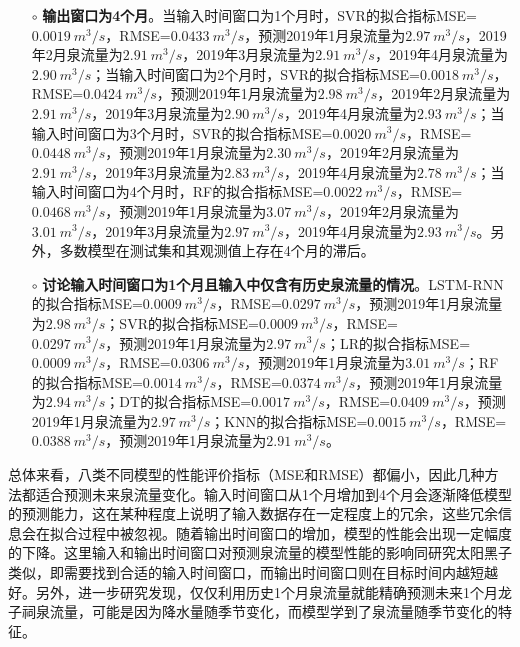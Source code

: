 \begin{enumerate}
\begin{itemize}
    \item[$\circ$] \textbf{输出窗口为4个月}。当输入时间窗口为1个月时，SVR的拟合指标MSE=\\$\SI{0.0019}{m^{3}/s}$，RMSE=$\SI{0.0433}{m^{3}/s}$，预测2019年1月泉流量为$\SI{2.97}{m^{3}/s}$，2019年2月泉流量为$\SI{2.91}{m^{3}/s}$，2019年3月泉流量为$\SI{2.91}{m^{3}/s}$，2019年4月泉流量为$\SI{2.90}{m^{3}/s}$；当输入时间窗口为2个月时，SVR的拟合指标MSE=$\SI{0.0018}{m^{3}/s}$，RMSE=$\SI{0.0424}{m^{3}/s}$，预测2019年1月泉流量为$\SI{2.98}{m^{3}/s}$，2019年2月泉流量为$\SI{2.91}{m^{3}/s}$，2019年3月泉流量为$\SI{2.90}{m^{3}/s}$，2019年4月泉流量为$\SI{2.93}{m^{3}/s}$；当输入时间窗口为3个月时，SVR的拟合指标MSE=$\SI{0.0020}{m^{3}/s}$，RMSE=$\SI{0.0448}{m^{3}/s}$，预测2019年1月泉流量为$\SI{2.30}{m^{3}/s}$，2019年2月泉流量为$\SI{2.91}{m^{3}/s}$，2019年3月泉流量为$\SI{2.83}{m^{3}/s}$，2019年4月泉流量为$\SI{2.78}{m^{3}/s}$；当输入时间窗口为4个月时，RF的拟合指标MSE=$\SI{0.0022}{m^{3}/s}$，RMSE=$\SI{0.0468}{m^{3}/s}$，预测2019年1月泉流量为$\SI{3.07}{m^{3}/s}$，2019年2月泉流量为$\SI{3.01}{m^{3}/s}$，2019年3月泉流量为$\SI{2.97}{m^{3}/s}$，2019年4月泉流量为$\SI{2.93}{m^{3}/s}$。另外，多数模型在测试集和其观测值上存在4个月的滞后。
    \item[$\circ$] \textbf{讨论输入时间窗口为1个月且输入中仅含有历史泉流量的情况}。LSTM-RNN的拟合指标MSE=$\SI{0.0009}{m^{3}/s}$，RMSE=$\SI{0.0297}{m^{3}/s}$，预测2019年1月泉流量为$\SI{2.98}{m^{3}/s}$；SVR的拟合指标MSE=$\SI{0.0009}{m^{3}/s}$，RMSE=\\$\SI{0.0297}{m^{3}/s}$，预测2019年1月泉流量为$\SI{2.97}{m^{3}/s}$；LR的拟合指标MSE=$\SI{0.0009}{m^{3}/s}$，RMSE=$\SI{0.0306}{m^{3}/s}$，预测2019年1月泉流量为$\SI{3.01}{m^{3}/s}$；RF的拟合指标MSE=$\SI{0.0014}{m^{3}/s}$，RMSE=$\SI{0.0374}{m^{3}/s}$，预测2019年1月泉流量为$\SI{2.94}{m^{3}/s}$；DT的拟合指标MSE=$\SI{0.0017}{m^{3}/s}$，RMSE=$\SI{0.0409}{m^{3}/s}$，预测2019年1月泉流量为$\SI{2.97}{m^{3}/s}$；KNN的拟合指标MSE=$\SI{0.0015}{m^{3}/s}$，RMSE=$\SI{0.0388}{m^{3}/s}$，预测2019年1月泉流量为$\SI{2.91}{m^{3}/s}$。 
  \end{itemize}
    
  总体来看，八类不同模型的性能评价指标（MSE和RMSE）都偏小，因此几种方法都适合预测未来泉流量变化。输入时间窗口从1个月增加到4个月会逐渐降低模型的预测能力，这在某种程度上说明了输入数据存在一定程度上的冗余，这些冗余信息会在拟合过程中被忽视。随着输出时间窗口的增加，模型的性能会出现一定幅度的下降。这里输入和输出时间窗口对预测泉流量的模型性能的影响同研究太阳黑子类似，即需要找到合适的输入时间窗口，而输出时间窗口则在目标时间内越短越好。另外，进一步研究发现，仅仅利用历史1个月泉流量就能精确预测未来1个月龙子祠泉流量，可能是因为降水量随季节变化，而模型学到了泉流量随季节变化的特征。


\end{enumerate}
